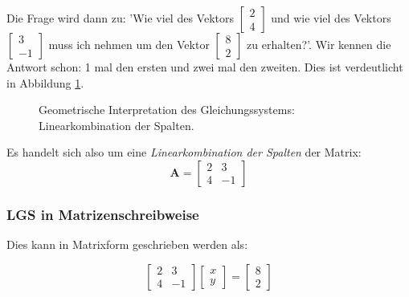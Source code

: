 Die Frage wird dann zu: 'Wie viel des Vektors $\begin{bmatrix} 2 \\ 4 \end{bmatrix}$ und wie viel des Vektors $\begin{bmatrix} 3 \\ -1 \end{bmatrix}$ muss ich nehmen um den Vektor $\begin{bmatrix} 8 \\ 2 \end{bmatrix}$ zu erhalten?'. Wir kennen die Antwort schon: 1 mal den ersten und zwei mal den zweiten. Dies ist verdeutlicht in Abbildung \ref{fig:lgs_geom_col}. 



\begin{figure}[H]
    \centering
    
    \caption{Geometrische Interpretation des Gleichungssystems: Linearkombination der Spalten.}
    \label{fig:lgs_geom_col}
\end{figure}

Es handelt sich also um eine \emph{Linearkombination der Spalten} der Matrix: $$\mathbf{A} = \begin{bmatrix} 2 & 3 \\ 4 & -1 \end{bmatrix}$$

\subsubsection{LGS in Matrizenschreibweise}


Dies kann in Matrixform geschrieben werden als:

\[
\begin{bmatrix} 2 & 3 \\ 4 & -1 \end{bmatrix}  
\begin{bmatrix} x \\ y \end{bmatrix}  
=
\begin{bmatrix} 8 \\ 2 \end{bmatrix}
\]





